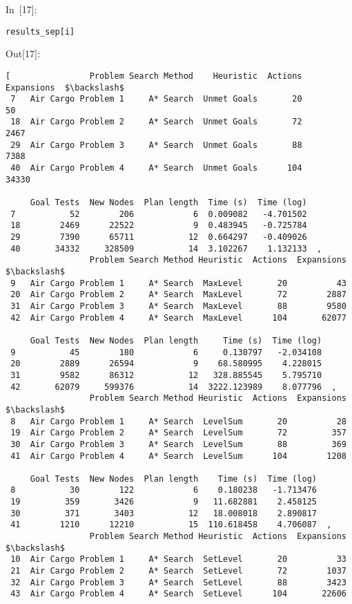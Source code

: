 \documentclass{article}
\begin{document}
In~[17]:

    
\begin{verbatim}results_sep[i]
\end{verbatim}











Out[17]:





\begin{verbatim}[                Problem Search Method    Heuristic  Actions  Expansions  $\backslash$
 7   Air Cargo Problem 1     A* Search  Unmet Goals       20          50   
 18  Air Cargo Problem 2     A* Search  Unmet Goals       72        2467   
 29  Air Cargo Problem 3     A* Search  Unmet Goals       88        7388   
 40  Air Cargo Problem 4     A* Search  Unmet Goals      104       34330   
 
     Goal Tests  New Nodes  Plan length  Time (s)  Time (log)  
 7           52        206            6  0.009082   -4.701502  
 18        2469      22522            9  0.483945   -0.725784  
 29        7390      65711           12  0.664297   -0.409026  
 40       34332     328509           14  3.102267    1.132133  ,
                 Problem Search Method Heuristic  Actions  Expansions  $\backslash$
 9   Air Cargo Problem 1     A* Search  MaxLevel       20          43   
 20  Air Cargo Problem 2     A* Search  MaxLevel       72        2887   
 31  Air Cargo Problem 3     A* Search  MaxLevel       88        9580   
 42  Air Cargo Problem 4     A* Search  MaxLevel      104       62077   
 
     Goal Tests  New Nodes  Plan length     Time (s)  Time (log)  
 9           45        180            6     0.130797   -2.034108  
 20        2889      26594            9    68.580995    4.228015  
 31        9582      86312           12   328.885545    5.795710  
 42       62079     599376           14  3222.123989    8.077796  ,
                 Problem Search Method Heuristic  Actions  Expansions  $\backslash$
 8   Air Cargo Problem 1     A* Search  LevelSum       20          28   
 19  Air Cargo Problem 2     A* Search  LevelSum       72         357   
 30  Air Cargo Problem 3     A* Search  LevelSum       88         369   
 41  Air Cargo Problem 4     A* Search  LevelSum      104        1208   
 
     Goal Tests  New Nodes  Plan length    Time (s)  Time (log)  
 8           30        122            6    0.180238   -1.713476  
 19         359       3426            9   11.682881    2.458125  
 30         371       3403           12   18.008018    2.890817  
 41        1210      12210           15  110.618458    4.706087  ,
                 Problem Search Method Heuristic  Actions  Expansions  $\backslash$
 10  Air Cargo Problem 1     A* Search  SetLevel       20          33   
 21  Air Cargo Problem 2     A* Search  SetLevel       72        1037   
 32  Air Cargo Problem 3     A* Search  SetLevel       88        3423   
 43  Air Cargo Problem 4     A* Search  SetLevel      104       22606   
 

\end{verbatim}
\end{document}
